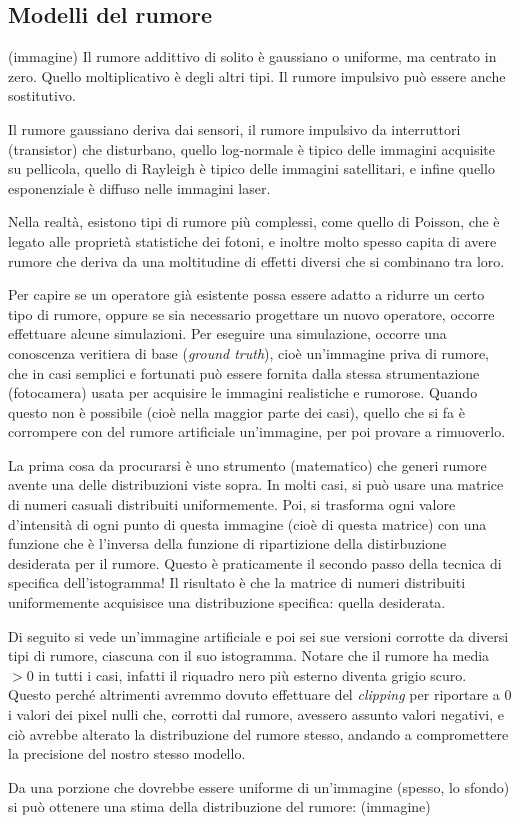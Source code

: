 \documentclass[a4paper,11pt]{article}
\begin{document}
\subsection{Modelli del rumore}
(immagine)
Il rumore addittivo di solito è gaussiano o uniforme, ma centrato in zero. Quello moltiplicativo è degli altri tipi. Il rumore impulsivo può essere anche
sostitutivo.
\par
Il rumore gaussiano deriva dai sensori, il rumore impulsivo da interruttori (transistor) che disturbano, quello log-normale è tipico delle immagini acquisite
su pellicola, quello di Rayleigh è tipico delle immagini satellitari, e infine quello esponenziale è diffuso nelle immagini laser.
\par
Nella realtà, esistono tipi di rumore più complessi, come quello di Poisson, che è legato alle proprietà statistiche dei fotoni, e inoltre molto spesso
capita di avere rumore che deriva da una moltitudine di effetti diversi che si combinano tra loro.
\par
Per capire se un operatore già esistente possa essere adatto a ridurre un certo tipo di rumore, oppure se sia necessario progettare un nuovo operatore, occorre
effettuare alcune simulazioni. Per eseguire una simulazione, occorre una conoscenza veritiera di base (\textit{ground truth}), cioè un'immagine priva di rumore,
che in casi semplici e fortunati può essere fornita dalla stessa strumentazione (fotocamera) usata per acquisire le immagini realistiche e rumorose.
Quando questo non è possibile (cioè nella maggior parte dei casi), quello che si fa è corrompere con del rumore artificiale un'immagine, per poi provare a rimuoverlo.
\par
La prima cosa da procurarsi è uno strumento (matematico) che generi rumore avente una delle distribuzioni viste sopra. In molti casi, si può usare una matrice di numeri casuali
distribuiti uniformemente. Poi, si trasforma ogni valore d'intensità di ogni punto di questa immagine (cioè di questa matrice) con una funzione che è l'inversa della funzione di
ripartizione della distirbuzione desiderata per il rumore. Questo è praticamente il secondo passo della tecnica di specifica dell'istogramma! Il risultato è che la matrice
di numeri distribuiti uniformemente acquisisce una distribuzione specifica: quella desiderata.
\par
Di seguito si vede un'immagine artificiale e poi sei sue versioni corrotte da diversi tipi di rumore, ciascuna con il suo istogramma.
Notare che il rumore ha media $> 0$ in tutti i casi, infatti il riquadro nero più esterno diventa grigio scuro. Questo perché altrimenti avremmo dovuto effettuare del \textit{clipping}
per riportare a 0 i valori dei pixel nulli che, corrotti dal rumore, avessero assunto valori negativi, e ciò avrebbe alterato la distribuzione del rumore stesso, andando a compromettere la precisione
del nostro stesso modello.
\par
Da una porzione che dovrebbe essere uniforme di un'immagine (spesso, lo sfondo) si può ottenere una stima della distribuzione del rumore: (immagine)
\end{document}

